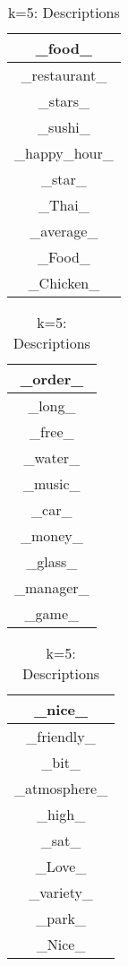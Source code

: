 \documentclass{article}
\begin{document}
\begin{table}[ht]
    \parbox{.25\linewidth}{
    \centering
    \begin{tabular}{|c|}
    \hline
    \_food\_\\
    \hline
    \_restaurant\_\\
    \hline
    \_stars\_\\
    \hline
    \_sushi\_\\
    \hline
    \_happy\_hour\_\\
    \hline
    \_star\_\\
    \hline
    \_Thai\_\\
    \hline
    \_average\_\\
    \hline
    \_Food\_\\
    \hline
    \_Chicken\_\\
    \hline
    \end{tabular}
    \caption{k=5: Restaurants/Food}
    }
    \hfill
    \parbox{.25\linewidth}{
    \centering
    \begin{tabular}{|c|}
    \hline
    \_order\_\\
    \hline
    \_long\_\\
    \hline
    \_free\_\\
    \hline
    \_water\_\\
    \hline
    \_music\_\\
    \hline
    \_car\_\\
    \hline
    \_money\_\\
    \hline
    \_glass\_\\
    \hline
    \_manager\_\\
    \hline
    \_game\_\\
    \hline
    \end{tabular}
    \caption{k=5: Miscellaneous}
    }
    \hfill
    \parbox{.25\linewidth}{
    \centering
    \begin{tabular}{|c|}
    \hline
    \_nice\_\\
    \hline
    \_friendly\_\\
    \hline
    \_bit\_\\
    \hline
    \_atmosphere\_\\
    \hline
    \_high\_\\
    \hline
    \_sat\_\\
    \hline
    \_Love\_\\
    \hline
    \_variety\_\\
    \hline
    \_park\_\\
    \hline
    \_Nice\_\\
    \hline
    \end{tabular}
    \caption{k=5: Descriptions}
    }
\end{table}\\
\end{document}
